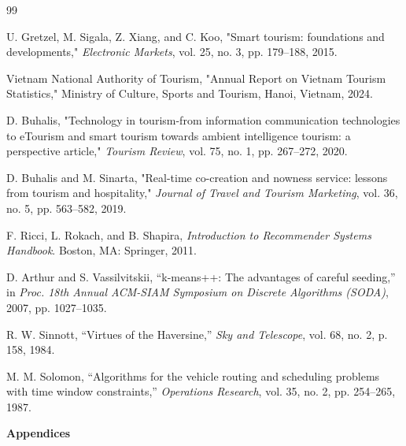 \documentclass[a4paper,12pt]{report}
\begin{document}
\begin{thebibliography}{99}
\setlength{\itemsep}{0.8em} %

 U. Gretzel, M. Sigala, Z. Xiang, and C. Koo, "Smart tourism: foundations and developments," \textit{Electronic Markets}, vol. 25, no. 3, pp. 179--188, 2015.

 Vietnam National Authority of Tourism, "Annual Report on Vietnam Tourism Statistics," Ministry of Culture, Sports and Tourism, Hanoi, Vietnam, 2024.

 D. Buhalis, "Technology in tourism-from information communication technologies to eTourism and smart tourism towards ambient intelligence tourism: a perspective article," \textit{Tourism Review}, vol. 75, no. 1, pp. 267--272, 2020.

 D. Buhalis and M. Sinarta, "Real-time co-creation and nowness service: lessons from tourism and hospitality," \textit{Journal of Travel and Tourism Marketing}, vol. 36, no. 5, pp. 563--582, 2019.

 F. Ricci, L. Rokach, and B. Shapira, \textit{Introduction to Recommender Systems Handbook}. Boston, MA: Springer, 2011.

 D. Arthur and S. Vassilvitskii, ``k-means++: The advantages of careful seeding,'' in \textit{Proc. 18th Annual ACM-SIAM Symposium on Discrete Algorithms (SODA)}, 2007, pp. 1027--1035.

 R. W. Sinnott, ``Virtues of the Haversine,'' \textit{Sky and Telescope}, vol. 68, no. 2, p. 158, 1984.

 M. M. Solomon, ``Algorithms for the vehicle routing and scheduling problems with time window constraints,'' \textit{Operations Research}, vol. 35, no. 2, pp. 254--265, 1987.

\end{thebibliography}

\newpage
\vspace*{-20pt}
\begin{center}
\huge\bfseries Appendices
\end{center}
\vspace{10pt}
\end{document}
